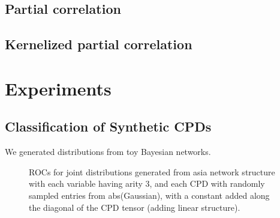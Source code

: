 \documentclass{article} %
\newlength{\subfigheight}
\begin{document}
\subsection{Partial correlation}

\subsection{Kernelized partial correlation}

\section{Experiments}

\subsection{Classification of Synthetic CPDs}
We generated distributions from toy Bayesian networks.

\begin{figure}[h]
\centering
\caption{ROCs for joint distributions generated from asia network structure with each variable having arity 3, and each CPD with randomly sampled entries from abs(Gaussian), with a constant added along the diagonal of the CPD tensor (adding linear structure).}
\end{figure}
\end{document}
